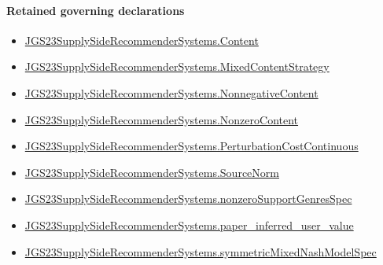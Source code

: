 \documentclass[10pt]{article}
\begin{document}
\paragraph{Retained governing declarations}
\begin{itemize}\raggedright
\item \hyperlink{governing-declaration-367305fda50f0ada}{JGS23\allowbreak{}Supply\allowbreak{}Side\allowbreak{}Recommender\allowbreak{}Systems.\allowbreak{}Content}
\item \hyperlink{governing-declaration-2089965d06cf0282}{JGS23\allowbreak{}Supply\allowbreak{}Side\allowbreak{}Recommender\allowbreak{}Systems.\allowbreak{}Mixed\allowbreak{}Content\allowbreak{}Strategy}
\item \hyperlink{governing-declaration-d426babe40b9593c}{JGS23\allowbreak{}Supply\allowbreak{}Side\allowbreak{}Recommender\allowbreak{}Systems.\allowbreak{}Nonnegative\allowbreak{}Content}
\item \hyperlink{governing-declaration-90e2ac7d13788c50}{JGS23\allowbreak{}Supply\allowbreak{}Side\allowbreak{}Recommender\allowbreak{}Systems.\allowbreak{}Nonzero\allowbreak{}Content}
\item \hyperlink{governing-declaration-0d3b6ecbfa8091f6}{JGS23\allowbreak{}Supply\allowbreak{}Side\allowbreak{}Recommender\allowbreak{}Systems.\allowbreak{}Perturbation\allowbreak{}Cost\allowbreak{}Continuous}
\item \hyperlink{governing-declaration-6141339a5d3412d9}{JGS23\allowbreak{}Supply\allowbreak{}Side\allowbreak{}Recommender\allowbreak{}Systems.\allowbreak{}Source\allowbreak{}Norm}
\item \hyperlink{governing-declaration-588c7a0b2af225d7}{JGS23\allowbreak{}Supply\allowbreak{}Side\allowbreak{}Recommender\allowbreak{}Systems.\allowbreak{}nonzero\allowbreak{}Support\allowbreak{}Genres\allowbreak{}Spec}
\item \hyperlink{governing-declaration-48347eafb3702717}{JGS23\allowbreak{}Supply\allowbreak{}Side\allowbreak{}Recommender\allowbreak{}Systems.\allowbreak{}paper\_\allowbreak{}inferred\_\allowbreak{}user\_\allowbreak{}value}
\item \hyperlink{paper-prerequisite-b412efba7deb757f}{JGS23\allowbreak{}Supply\allowbreak{}Side\allowbreak{}Recommender\allowbreak{}Systems.\allowbreak{}symmetric\allowbreak{}Mixed\allowbreak{}Nash\allowbreak{}Model\allowbreak{}Spec}
\end{itemize}
\end{document}
